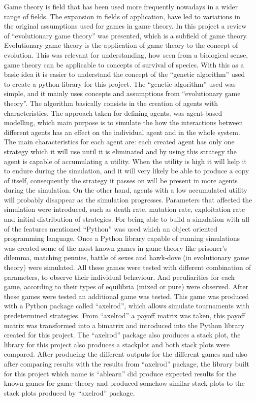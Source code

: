 Game theory is field that has been used more frequently nowadays in a wider range of fields. The expansion in fields of application, have led to variations in the original assumptions used for games in game theory. In this project a review of  ``evolutionary game theory'' was presented, which is a subfield of game theory. Evolutionary game theory is the application of game theory to the concept of evolution. This was relevant for understanding, how seen from a biological sense, game theory can be applicable to concepts of survival of species. With this as a basic idea it is easier to understand the concept of the ``genetic algorithm'' used to create a python library for this project. The ``genetic algorithm'' used was simple, and it mainly uses concepts and assumptions from ``evolutionary game theory''. The algorithm basically consists in the creation of agents with characteristics. The approach taken for defining agents, was agent-based modelling, which main purpose is to simulate the how the interactions between different agents has an effect on the individual agent and in the whole system. The main characteristics for each agent are: each created agent has only one strategy which it will use until it is eliminated and by using this strategy the agent is capable of accumulating a utility. When the utility is high it will help it to endure during the simulation, and it will very likely be able to produce a copy of itself, consequently the strategy it passes on will be present in more agents during the simulation. On the other hand, agents with a low accumulated utility will probably disappear as the simulation progresses. Parameters that affected  the simulation were introduced, such as death rate, mutation rate, exploitation rate and initial distribution of strategies. For being able to build a simulation with all of the features mentioned ``Python'' was used which an object oriented programming language. Once a Python library capable of running simulations was created some of the most known games in game theory like prisoner's dilemma, matching pennies, battle of sexes and hawk-dove (in evolutionary game theory) were simulated. All these games were tested with different combination of parameters, to observe their individual behaviour. And peculiarities for each game, according to their types of equilibria (mixed or pure) were observed. After these games were tested an additional game was tested. This game was produced with a Python package called ``axelrod'', which allows simulate tournaments with predetermined strategies. From ``axelrod'' a payoff matrix was taken, this payoff matrix was transformed into a bimatrix and introduced into the Python library created for this project. The ``axelrod'' package also produces a stack plot, the library for this project also produces a stackplot and both stack plots were compared. After producing the different outputs for the different games and also after comparing results with the results from ``axelrod'' package, the library built for this project which name is ``ablearn'' did produce expected results for the known games for game theory and produced somehow similar stack plots to the stack plots produced by ``axelrod'' package.